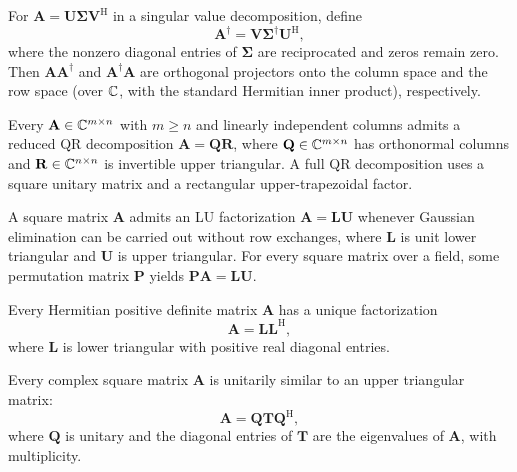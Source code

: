 \begin{definition}
For $\mathbf{A}=\mathbf{U}\boldsymbol\Sigma\mathbf{V}^{\mathrm{H}}$ in a singular value decomposition, define
\[
 \mathbf{A}^\dagger=\mathbf{V}\boldsymbol\Sigma^\dagger\mathbf{U}^{\mathrm{H}},
\]
where the nonzero diagonal entries of $\boldsymbol\Sigma$ are reciprocated and zeros remain zero. Then $\mathbf{A}\mathbf{A}^\dagger$ and $\mathbf{A}^\dagger\mathbf{A}$ are orthogonal projectors onto the column space and the row space (over $\mathbb{C}$, with the standard Hermitian inner product), respectively.
\end{definition}

\begin{theorem}[QR Decomposition]
Every $\mathbf{A}\in\mathbb{C}^{m\times n}$ with $m\ge n$ and linearly independent columns admits a reduced QR decomposition $\mathbf{A}=\mathbf{Q}\mathbf{R}$, where $\mathbf{Q}\in\mathbb{C}^{m\times n}$ has orthonormal columns and $\mathbf{R}\in\mathbb{C}^{n\times n}$ is invertible upper triangular. A full QR decomposition uses a square unitary matrix and a rectangular upper-trapezoidal factor.
\end{theorem}

\begin{theorem}
A square matrix $\mathbf{A}$ admits an LU factorization $\mathbf{A}=\mathbf{L}\mathbf{U}$ whenever Gaussian elimination can be carried out without row exchanges, where $\mathbf{L}$ is unit lower triangular and $\mathbf{U}$ is upper triangular. For every square matrix over a field, some permutation matrix $\mathbf{P}$ yields $\mathbf{P}\mathbf{A}=\mathbf{L}\mathbf{U}$.
\end{theorem}

\begin{theorem}
Every Hermitian positive definite matrix $\mathbf{A}$ has a unique factorization
\[
 \mathbf{A}=\mathbf{L}\mathbf{L}^{\mathrm{H}},
\]
where $\mathbf{L}$ is lower triangular with positive real diagonal entries.
\end{theorem}

\begin{theorem}
Every complex square matrix $\mathbf{A}$ is unitarily similar to an upper triangular matrix:
\[
 \mathbf{A}=\mathbf{Q}\mathbf{T}\mathbf{Q}^{\mathrm{H}},
\]
where $\mathbf{Q}$ is unitary and the diagonal entries of $\mathbf{T}$ are the eigenvalues of $\mathbf{A}$, with multiplicity.
\end{theorem}

